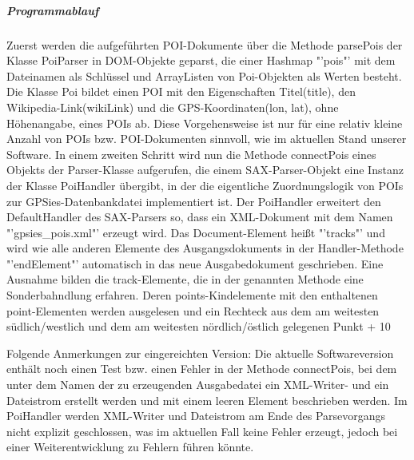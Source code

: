 \subparagraph{Programmablauf}
Zuerst werden die aufgeführten POI-Dokumente über die Methode parsePois der Klasse PoiParser in DOM-Objekte geparst, die einer Hashmap "'pois"' mit dem Dateinamen als Schlüssel und ArrayListen von Poi-Objekten als Werten besteht. Die Klasse Poi bildet einen POI mit den Eigenschaften Titel(title), den Wikipedia-Link(wikiLink) und die GPS-Koordinaten(lon, lat), ohne Höhenangabe, eines POIs ab. Diese Vorgehensweise ist nur für eine relativ kleine Anzahl von POIs bzw. POI-Dokumenten sinnvoll, wie im aktuellen Stand unserer Software.
In einem zweiten Schritt wird nun die Methode connectPois eines Objekts der Parser-Klasse aufgerufen, die einem SAX-Parser-Objekt eine Instanz der Klasse PoiHandler übergibt, in der die eigentliche Zuordnungslogik von POIs zur GPSies-Datenbankdatei implementiert ist. 
Der PoiHandler erweitert den DefaultHandler des SAX-Parsers so, dass ein XML-Dokument mit dem Namen "'gpsies_pois.xml"' erzeugt wird. Das Document-Element heißt "'tracks"' und wird wie alle anderen Elemente des Ausgangsdokuments in der Handler-Methode "'endElement"' automatisch in das neue Ausgabedokument geschrieben. Eine Ausnahme bilden die track-Elemente, die in der genannten Methode eine Sonderbahndlung erfahren. Deren points-Kindelemente mit den enthaltenen point-Elementen werden ausgelesen und ein Rechteck aus dem am weitesten südlich/westlich und dem am weitesten nördlich/östlich gelegenen Punkt + 10%

Folgende Anmerkungen zur eingereichten Version: Die aktuelle Softwareversion enthält noch einen Test bzw. einen Fehler in der Methode connectPois, bei dem unter dem Namen der zu erzeugenden Ausgabedatei ein XML-Writer- und ein Dateistrom erstellt werden und mit einem leeren Element beschrieben werden. Im PoiHandler werden XML-Writer und Dateistrom am Ende des Parsevorgangs nicht explizit geschlossen, was im aktuellen Fall keine Fehler erzeugt, jedoch bei einer Weiterentwicklung zu Fehlern führen könnte.